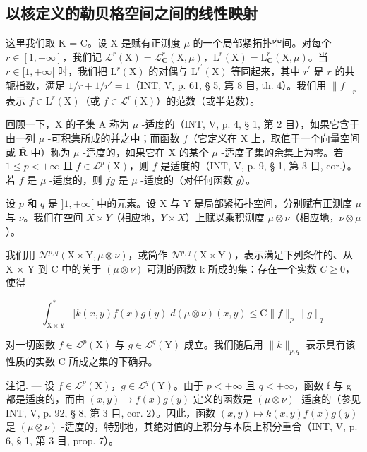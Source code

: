 \subsection{以核定义的勒贝格空间之间的线性映射}

这里我们取 K = C。设 X 是赋有正测度 \(\mu\) 的一个局部紧拓扑空间。对每个 \(r \in [1, +\infty]\)，我们记 \(\mathcal{L}^r (\mathrm{X}) = \mathcal{L}_{\mathbf{C}}^r (\mathrm{X},\mu)\)，\(\mathrm{L}^r (\mathrm{X}) = \mathrm{L}_{\mathbf{C}}^r (\mathrm{X},\mu)\)。当 \(r\in [1, + \infty [\) 时，我们把 \(\mathrm{L}^r (\mathrm{X})\) 的对偶与 \(\mathrm{L}^{r^{\prime}}(\mathrm{X})\) 等同起来，其中 \(r^\prime\) 是 \(r\) 的共轭指数，满足 \(1 / r + 1 / r' = 1\)（INT, V, p. 61, § 5, 第 8 目, th. 4）。我们用 \(\| f\| _r\) 表示 \(f\in \mathrm{L}^r (\mathrm{X})\)（或 \(f\in \mathcal{L}^r (\mathrm{X})\)）的范数（或半范数）。

回顾一下，X 的子集 A 称为 \(\mu\) -适度的（INT, V, p. 4, § 1, 第 2 目），如果它含于由一列 \(\mu\) -可积集所成的并之中；而函数 \(f\)（它定义在 X 上，取值于一个向量空间或 \(\overline{\mathbf{R}}\) 中）称为 \(\mu\) -适度的，如果它在 X 的某个 \(\mu\) -适度子集的余集上为零。若 \(1 \leqslant p < +\infty\) 且 \(f \in \mathcal{L}^p(\mathrm{X})\)，则 \(f\) 是适度的（INT, V, p. 9, § 1, 第 3 目, cor.）。若 \(f\) 是 \(\mu\) -适度的，则 \(fg\) 是 \(\mu\) -适度的（对任何函数 \(g\)）。

设 \(p\) 和 \(q\) 是 \(]1, +\infty[\) 中的元素。设 X 与 Y 是局部紧拓扑空间，分别赋有正测度 \(\mu\) 与 \(\nu\)。我们在空间 \(X \times Y\)（相应地，\(Y \times X\)）上赋以乘积测度 \(\mu \otimes \nu\)（相应地，\(\nu \otimes \mu\)）。

我们用 \(\mathcal{N}^{p,q}(\mathrm{X}\times\mathrm{Y},\mu\otimes\nu)\)，或简作 \(\mathcal{N}^{p,q}(\mathrm{X}\times\mathrm{Y})\)，表示满足下列条件的、从 X × Y 到 C 中的关于 \((\mu\otimes\nu)\) 可测的函数 k 所成的集：存在一个实数 \(C\geqslant0\)，使得

\[
\int_ {\mathrm{X} \times \mathrm{Y}} ^ {*} | k (x, y) f (x) g (y) | d (\mu \otimes \nu) (x, y) \leqslant \mathrm{C} \| f \| _ {p} \| g \| _ {q}\tag{2}
\]

对一切函数 \(f \in \mathcal{L}^p(\mathrm{X})\) 与 \(g \in \mathcal{L}^q(\mathrm{Y})\) 成立。我们随后用 \(\| k \|_{p,q}\) 表示具有该性质的实数 C 所成之集的下确界。

注记. --- 设 \(f \in \mathcal{L}^{p}(\mathrm{X})\)，\(g \in \mathcal{L}^{q}(\mathrm{Y})\)。由于 \(p < +\infty\) 且 \(q < +\infty\)，函数 f 与 g 都是适度的，而由 \((x, y) \mapsto f(x)g(y)\) 定义的函数是 \((\mu \otimes \nu)\) -适度的（参见 INT, V, p. 92, § 8, 第 3 目, cor. 2）。因此，函数 \((x, y) \mapsto k(x, y)f(x)g(y)\) 是 \((\mu \otimes \nu)\) -适度的，特别地，其绝对值的上积分与本质上积分重合（INT, V, p. 6, § 1, 第 3 目, prop. 7）。

